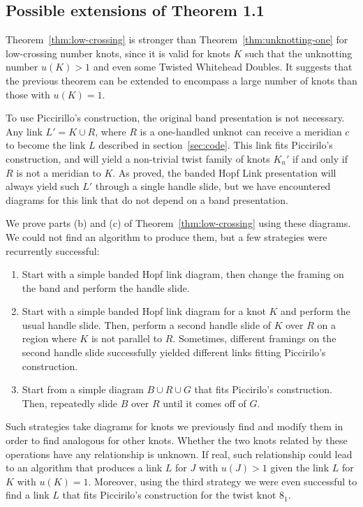 \documentclass[11pt,usenames,dvipsnames,reqno]{amsart}
\numberwithin{theorem}{section}
\theoremstyle{ex}
\theoremstyle{rem}
\begin{document}
\subsection{Possible extensions of Theorem 1.1}

Theorem~\ref{thm:low-crossing} is stronger than Theorem~\ref{thm:unknotting-one} for low-crossing number knots, since it is valid for knots $K$ such that the unknotting number $u(K) > 1$ and even some Twisted Whitehead Doubles. It suggests that the previous theorem can be extended to encompass a large number of knots than those with $u(K)=1$.

To use Piccirillo's construction, the original band presentation is not necessary. Any link $L' = K\cup R$, where $R$ is a one-handled unknot can receive a meridian $c$ to become the link $L$ described in section~\ref{sec:code}. This link fits Piccirilo's construction, and will yield a non-trivial twist family of knots $K_{n}'$ if and only if $R$ is not a meridian to $K$. As proved, the banded Hopf Link presentation will always yield such $L'$ through a single handle slide, but we have encountered diagrams for this link that do not depend on a band presentation.

We prove parts (b) and (c) of Theorem~\ref{thm:low-crossing} using these diagrams. We could not find an algorithm to produce them, but a few strategies were recurrently successful:

\begin{enumerate}
	\item Start with a simple banded Hopf link diagram, then change the framing on the band and perform the handle slide.
	\item Start with a simple banded Hopf link diagram for a knot $K$ and perform the usual handle slide. Then, perform a second handle slide of $K$ over $R$ on a region where $K$ is not parallel to $R$. Sometimes, different framings on the second handle slide successfully yielded different links fitting Piccirilo's construction.
	\item Start from a simple diagram $B \cup R \cup G$ that fits Piccirilo's construction. Then, repeatedly slide $B$ over $R$ until it comes off of $G$.
\end{enumerate}

Such strategies take diagrams for knots we previously find and modify them in order to find analogous for other knots. Whether the two knots related by these operations have any relationship is unknown. If real, such relationship could lead to an algorithm that produces a link $L$ for $J$ with $u(J) > 1$ given the link $L$ for $K$ with $u(K) = 1$. Moreover, using the third strategy we were even successful to find a link $L$ that fits Piccirilo's construction for the twist knot $8_1$.
\end{document}
